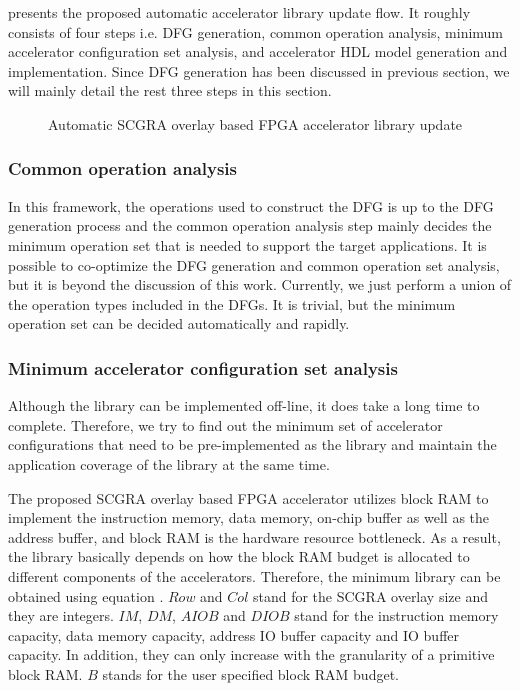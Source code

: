  presents the proposed automatic accelerator library update flow. It
roughly consists of four steps i.e. DFG generation, common operation analysis, minimum accelerator
configuration set analysis, and accelerator HDL model generation and implementation. Since DFG generation
has been discussed in previous section, we will mainly detail the rest three steps in this section.
\begin{figure}
\vspace{-1em}
\caption{Automatic SCGRA overlay based FPGA accelerator library update}
\label{fig:auto-lib-gen}
\vspace{-1.5em}
\end{figure}

\subsubsection{Common operation analysis}
In this framework, the operations used to construct the DFG is up to the DFG generation process and the common operation analysis step mainly decides the minimum operation set that is needed to support the target applications. It is possible to co-optimize the DFG generation and common operation set analysis, but it is beyond the discussion of this work. Currently, we just perform a union of the operation types included in the DFGs. It is trivial, but the minimum operation set can be decided automatically and rapidly.

\subsubsection{Minimum accelerator configuration set analysis}
Although the library can be implemented off-line, it does take a long time to complete.
Therefore, we try to find out the minimum set of accelerator configurations that need to be
pre-implemented as the library and maintain the application coverage of the library at the same
time. 

The proposed SCGRA overlay based FPGA accelerator utilizes
block RAM to implement the instruction memory, data memory, on-chip buffer as well as the address
buffer, and block RAM is the hardware resource bottleneck. As a result, the library basically depends on how
the block RAM budget is allocated to different components of the accelerators. Therefore, the
minimum library can be obtained using equation . $Row$ and $Col$ stand for the SCGRA
overlay size and they are integers. $IM$, $DM$, $AIOB$ and $DIOB$ stand for the instruction memory capacity,
data memory capacity, address IO buffer capacity and IO buffer capacity. In addition, they can only increase with the granularity of a primitive block RAM. $B$ stands for the user specified block RAM budget. 

